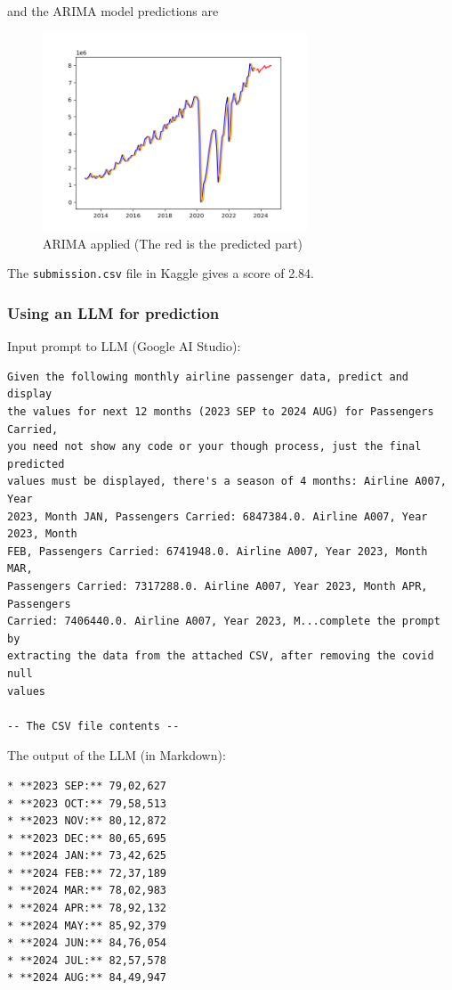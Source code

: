 \documentclass{article}
\begin{document}
and the ARIMA model predictions are

\begin{figure}[H]
  \centering
  \includegraphics[width=0.7\textwidth]{ARIMA.png}
  \caption{ARIMA applied (The red is the predicted part)}
\end{figure}

The \texttt{submission.csv} file in Kaggle gives a score of 2.84.

\subsubsection{Using an LLM for prediction}

Input prompt to LLM (Google AI Studio):

\begin{verbatim}
Given the following monthly airline passenger data, predict and display
the values for next 12 months (2023 SEP to 2024 AUG) for Passengers Carried,
you need not show any code or your though process, just the final predicted
values must be displayed, there's a season of 4 months: Airline A007, Year
2023, Month JAN, Passengers Carried: 6847384.0. Airline A007, Year 2023, Month
FEB, Passengers Carried: 6741948.0. Airline A007, Year 2023, Month MAR,
Passengers Carried: 7317288.0. Airline A007, Year 2023, Month APR, Passengers
Carried: 7406440.0. Airline A007, Year 2023, M...complete the prompt by
extracting the data from the attached CSV, after removing the covid null
values

-- The CSV file contents --
\end{verbatim}

\noindent The output of the LLM (in Markdown):

\begin{verbatim}
* **2023 SEP:** 79,02,627
* **2023 OCT:** 79,58,513
* **2023 NOV:** 80,12,872
* **2023 DEC:** 80,65,695
* **2024 JAN:** 73,42,625
* **2024 FEB:** 72,37,189
* **2024 MAR:** 78,02,983
* **2024 APR:** 78,92,132
* **2024 MAY:** 85,92,379
* **2024 JUN:** 84,76,054
* **2024 JUL:** 82,57,578
* **2024 AUG:** 84,49,947
\end{verbatim}
\end{document}
